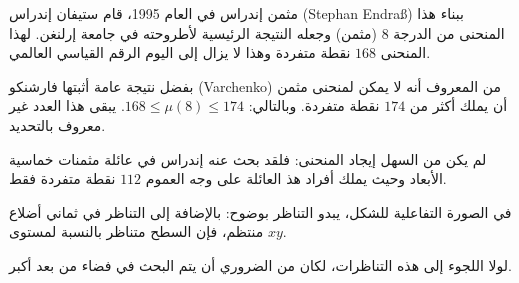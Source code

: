 \begin{surferPage}{مثمن إندراس}
    في العام 1995، قام ستيفان إندراس
    \textenglish{(Stephan Endraß)} ببناء هذا المنحنى من الدرجة $8$ (مثمن) وجعله النتيجة الرئيسية لأطروحته في جامعة إرلنغن.
     لهذا المنحنى $168$ نقطة متفردة وهذا لا يزال إلى اليوم الرقم القياسي العالمي.
  
     بفضل نتيجة عامة أثبتها فارشنكو 
     \textenglish{(Varchenko)}
      من المعروف أنه لا يمكن لمنحنى مثمن أن يملك أكثر من $174$ نقطة متفردة.
    وبالتالي: $168 \le \mu(8) \le 174$.
    يبقى هذا العدد غير معروف بالتحديد.

     لم يكن من السهل إيجاد المنحنى: فلقد بحث عنه إندراس في عائلة مثمنات خماسية الأبعاد وحيث يملك أفراد هذ العائلة على وجه العموم $112$ نقطة متفردة فقط.

    في الصورة التفاعلية للشكل، يبدو التناظر بوضوح: 
    بالإضافة إلى التناظر في ثماني أضلاع منتظم، فإن السطح متناظر بالنسبة لمستوى $xy$.

     لولا اللجوء إلى هذه التناظرات، لكان من الضروري أن يتم البحث في فضاء من بعد أكبر. 
\end{surferPage}

